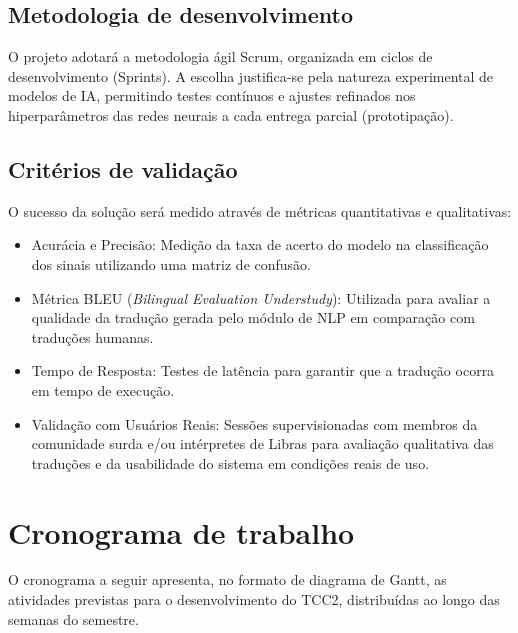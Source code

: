 \documentclass[
    12pt,                %
    openright,           %
    oneside,             %
    a4paper,             %
    english,             %
    brazil               %
]{abntex2}
\begin{document}
\subsection{Metodologia de desenvolvimento}
O projeto adotará a metodologia ágil Scrum, organizada em ciclos de desenvolvimento (Sprints). A escolha justifica-se pela natureza experimental de modelos de IA, permitindo testes contínuos e ajustes refinados nos hiperparâmetros das redes neurais a cada entrega parcial (prototipação).
\subsection{Critérios de validação}
O sucesso da solução será medido através de métricas quantitativas e qualitativas:
\begin{itemize}
    \item Acurácia e Precisão: Medição da taxa de acerto do modelo na classificação dos sinais utilizando uma matriz de confusão.
    \item Métrica BLEU (\textit{Bilingual Evaluation Understudy}): Utilizada para avaliar a qualidade da tradução gerada pelo módulo de NLP em comparação com traduções humanas.
    \item Tempo de Resposta: Testes de latência para garantir que a tradução ocorra em tempo de execução.
    \item Validação com Usuários Reais: Sessões supervisionadas com membros da comunidade surda e/ou intérpretes de Libras para avaliação qualitativa das traduções e da usabilidade do sistema em condições reais de uso.
\end{itemize}

\section{Cronograma de trabalho}
\label{sec:cronograma}
 
O cronograma a seguir apresenta, no formato de diagrama de Gantt, as atividades previstas para o desenvolvimento do TCC2, distribuídas ao longo das semanas do semestre.
 
\end{document}
